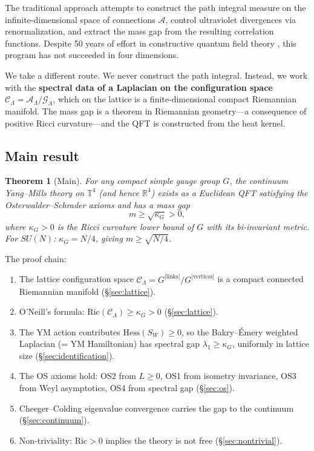 \documentclass[11pt]{article}
\newtheorem{theorem}{Theorem}[section]
\theoremstyle{definition}
\newcommand{\calA}{\mathcal{A}}
\newcommand{\calG}{\mathcal{G}}
\newcommand{\calC}{\mathcal{C}}
\newcommand{\Ric}{\mathrm{Ric}}
\newcommand{\Hess}{\mathrm{Hess}}
\newcommand{\R}{\mathbb{R}}
\newcommand{\T}{\mathbb{T}}
\begin{document}
The traditional approach attempts to construct the path integral measure on the infinite-dimensional space of connections $\calA$, control ultraviolet divergences via renormalization, and extract the mass gap from the resulting correlation functions. Despite 50 years of effort in constructive quantum field theory \cite{GlimmJaffe}, this program has not succeeded in four dimensions.

We take a different route. We never construct the path integral. Instead, we work with the \textbf{spectral data of a Laplacian on the configuration space} $\calC_\Lambda = \calA_\Lambda/\calG_\Lambda$, which on the lattice is a finite-dimensional compact Riemannian manifold. The mass gap is a theorem in Riemannian geometry---a consequence of positive Ricci curvature---and the QFT is constructed from the heat kernel.

\subsection{Main result}

\begin{theorem}[Main]\label{thm:main-intro}
For any compact simple gauge group $G$, the continuum Yang--Mills theory on $\T^4$ (and hence $\R^4$) exists as a Euclidean QFT satisfying the Osterwalder--Schrader axioms and has a mass gap
\begin{equation}\label{eq:main-gap}
    m \geq \sqrt{\kappa_G} > 0,
\end{equation}
where $\kappa_G > 0$ is the Ricci curvature lower bound of $G$ with its bi-invariant metric. For $SU(N)$: $\kappa_G = N/4$, giving $m \geq \sqrt{N/4}$.
\end{theorem}

The proof chain:
\begin{enumerate}
    \item The lattice configuration space $\calC_\Lambda = G^{|\text{links}|}/G^{|\text{vertices}|}$ is a compact connected Riemannian manifold (\S\ref{sec:lattice}).

    \item O'Neill's formula: $\Ric(\calC_\Lambda) \geq \kappa_G > 0$ (\S\ref{sec:lattice}).

    \item The YM action contributes $\Hess(S_W) \geq 0$, so the Bakry--\'Emery weighted Laplacian (= YM Hamiltonian) has spectral gap $\lambda_1 \geq \kappa_G$, uniformly in lattice size (\S\ref{sec:identification}).

    \item The OS axioms hold: OS2 from $L \geq 0$, OS1 from isometry invariance, OS3 from Weyl asymptotics, OS4 from spectral gap (\S\ref{sec:os}).

    \item Cheeger--Colding eigenvalue convergence carries the gap to the continuum (\S\ref{sec:continuum}).

    \item Non-triviality: $\Ric > 0$ implies the theory is not free (\S\ref{sec:nontrivial}).
\end{enumerate}
\end{document}
